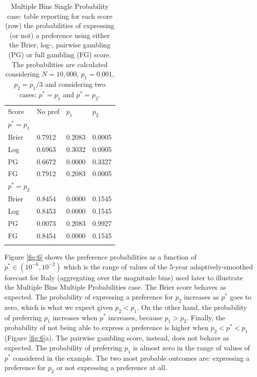 \documentclass[referee,sn-basic]{sn-jnl}
\theoremstyle{thmstyleone}%
\theoremstyle{thmstyletwo}%
\theoremstyle{thmstylethree}%
\begin{document}
\begin{table}
\caption{Multiple Bins Single Probability case: table reporting for each score (row) the probabilities of expressing (or not) a preference using either the Brier, log-, pairwise gambling (PG) or full gambling (FG) score. The probabilities are calculated considering $N = 10,000$, $p_1 = 0.001$, $p_2 = p_1/3$ and considering two cases: $p^* = p_1$ and $p^* = p_2$.}
\label{tab:2}       
\begin{tabular}{l |  l  l  l}
\hline\noalign{\smallskip}
Score & No pref & $p_1$ & $p_2$  \\
\noalign{\smallskip}\hline\noalign{\smallskip}
$p^* = p_1$ & & & \\
\noalign{\smallskip}\hline\noalign{\smallskip}
Brier & 0.7912 & 0.2083 & 0.0005 \\
Log & 0.6963 & 0.3032 & 0.0005 \\
PG & 0.6672 & 0.0000 & 0.3327 \\
FG & 0.7912 & 0.2083 & 0.0005 \\
\noalign{\smallskip}\hline\noalign{\smallskip}
$p^* = p_2$ & & & \\
\noalign{\smallskip}\hline\noalign{\smallskip}
Brier & 0.8454 & 0.0000 & 0.1545 \\
Log & 0.8453 & 0.0000 & 0.1545 \\
PG & 0.0073 & 0.2083 & 0.9927 \\
FG & 0.8454 & 0.0000 & 0.1545 \\
\noalign{\smallskip}\hline
\end{tabular}
\end{table}

Figure \ref{fig:6} shows the preference probabilities as a function of $p^* \in (10^{-6}, 10^{-2})$ which is the range of values of the 5-year adaptively-smoothed forecast for Italy (aggregating over the magnitude bins) used later to illustrate the Multiple Bins Multiple Probabilities case. The Brier score behaves as expected. The probability of expressing a preference for $p_2$ increases as $p^*$ goes to zero, which is what we expect given $p_2 < p_1$. On the other hand, the probability of preferring $p_1$ increases when $p^*$ increases, because $p_1 > p_2$. Finally, the probability of not being able to express a preference is higher when $p_2 < p^* < p_1$ (Figure \ref{fig:6}a). The pairwise gambling score, instead, does not behave as expected. The probability of preferring $p_1$ is almost zero in the range of values of $p^*$ considered in the example. The two most probable outcomes are: expressing a preference for $p_2$ or not expressing a preference at all. 
\end{document}
